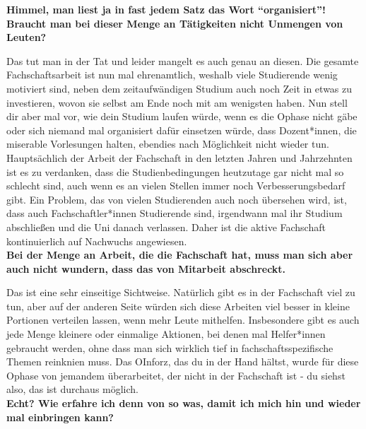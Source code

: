 {    \textbf{Himmel, man liest ja in fast jedem Satz das Wort "`organisiert"'! Braucht man bei dieser Menge an Tätigkeiten nicht Unmengen von Leuten?}

    Das tut man in der Tat und leider mangelt es auch genau an diesen. Die gesamte Fachschaftsarbeit ist nun mal ehrenamtlich, weshalb viele Studierende wenig motiviert sind, neben dem zeitaufwändigen Studium auch noch Zeit in etwas zu investieren, wovon sie selbst am Ende noch mit am wenigsten haben. Nun stell dir aber mal vor, wie dein Studium laufen würde, wenn es die Ophase nicht gäbe oder sich niemand mal organisiert dafür einsetzen würde, dass Dozent*innen, die miserable Vorlesungen halten, ebendies nach Möglichkeit nicht wieder tun. Hauptsächlich der Arbeit der Fachschaft in den letzten Jahren und Jahrzehnten ist es zu verdanken, dass die Studienbedingungen heutzutage gar nicht mal so schlecht sind, auch wenn es an vielen Stellen immer noch Verbesserungsbedarf gibt. Ein Problem, das von vielen Studierenden auch noch übersehen wird, ist, dass auch Fachschaftler*innen Studierende sind, irgendwann mal ihr Studium abschließen und die Uni danach verlassen. Daher ist die aktive Fachschaft kontinuierlich auf Nachwuchs angewiesen.\\

    \textbf{Bei der Menge an Arbeit, die die Fachschaft hat, muss man sich aber auch nicht wundern, dass das von Mitarbeit abschreckt.}

    Das ist eine sehr einseitige Sichtweise. Natürlich gibt es in der Fachschaft viel zu tun, aber auf der anderen Seite würden sich diese Arbeiten viel besser in kleine Portionen verteilen lassen, wenn mehr Leute mithelfen. Insbesondere gibt es auch jede Menge kleinere oder einmalige Aktionen, bei denen mal Helfer*innen gebraucht werden, ohne dass man sich wirklich tief in fachschaftsspezifische Themen reinknien muss. Das OInforz, das du in der Hand hältst, wurde für diese Ophase von jemandem überarbeitet, der nicht in der Fachschaft ist - du siehst also, das ist durchaus möglich.\\

    \textbf{Echt? Wie erfahre ich denn von so was, damit ich mich hin und wieder mal einbringen kann?}

}
